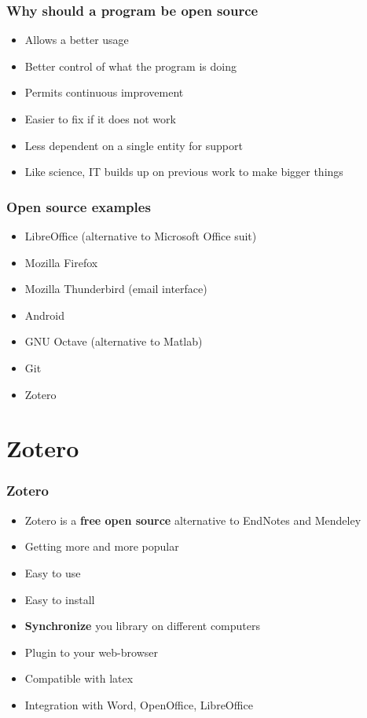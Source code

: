 \documentclass{beamer}
\begin{document}
\begin{frame}
\frametitle{Why should a program be open source}
\begin{itemize}
\item Allows a better usage 
\item Better control of what the program is doing
\item Permits continuous improvement
\item Easier to fix if it does not work
\item Less dependent on a single entity for support
\item Like science, IT builds up on previous work to make bigger things
\end{itemize}
\end{frame}

\begin{frame}
\frametitle{Open source examples}
\begin{itemize}
\item LibreOffice (alternative to Microsoft Office suit)
\item Mozilla Firefox 
\item Mozilla Thunderbird (email interface)
\item Android
\item GNU Octave (alternative to Matlab)
\item Git
\item Zotero
\end{itemize}
\end{frame}


\section{Zotero}
\begin{frame}
\frametitle{Zotero}
\begin{itemize}
\item Zotero is a \textbf{free open source} alternative to EndNotes and Mendeley
\item Getting more and more popular
\item Easy to use
\item Easy to install
\item \textbf{Synchronize} you library on different computers
\item Plugin to your web-browser
\item Compatible with latex
\item Integration with Word, OpenOffice, LibreOffice
\end{itemize}
\end{frame}
\end{document}
